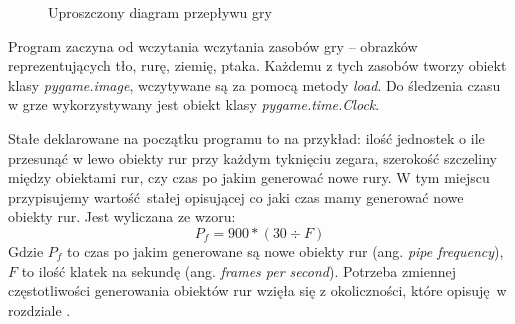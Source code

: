 \documentclass[a4paper,12pt,oneside]{book}
\begin{document}
\begin{figure}
\begin{center}
\end{center}
\caption{Uproszczony diagram przepływu gry}
\label{game_flow_chart}
\end{figure}
\newpage{}
Program zaczyna od wczytania wczytania zasobów gry -- obrazków reprezentujących
tło, rurę, ziemię, ptaka. Każdemu z tych zasobów tworzy obiekt klasy
\textit{pygame.image}, wczytywane są za pomocą metody \textit{load}.
Do śledzenia czasu w grze wykorzystywany jest obiekt klasy
\textit{pygame.time.Clock}.

Stałe deklarowane na początku programu to na
przykład: ilość jednostek o ile przesunąć w lewo obiekty rur przy każdym
tyknięciu zegara, szerokość szczeliny między obiektami rur, czy czas po jakim
generować nowe rury. W tym miejscu przypisujemy wartość stałej opisującej co
jaki czas mamy generować nowe obiekty rur. Jest wyliczana ze wzoru:
\begin{equation}
	P_f = 900 * (30 \div F)
\end{equation}
Gdzie $P_f$ to czas po jakim generowane są nowe obiekty rur
(ang. \textit{pipe frequency}), $F$ to ilość klatek na sekundę
(ang. \textit{frames per second}). Potrzeba zmiennej częstotliwości
generowania obiektów rur wzięła się z okoliczności, które opisuję w rozdziale
.
\end{document}

